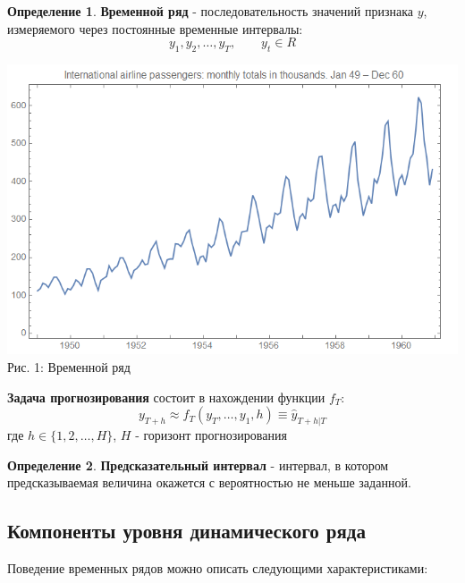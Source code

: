 \documentclass[aps,%
12pt,%
final,%
oneside,
onecolumn,%
musixtex, %
superscriptaddress,%
centertags]{article} %
\theoremstyle{plain}
\theoremstyle{definition}
\newtheorem{definition}{Определение}[subsection]
\theoremstyle{remark}
\begin{document}
\begin{definition}
	\textbf{Временной ряд}  - последовательность значений признака $y$, измеряемого через постоянные временные интервалы:
	$$y_1, y_2,\ldots, y_T, \qquad y_t \in R$$
\end{definition}

\begin{center}
	\includegraphics[scale=0.6]{images/1.png}
	Рис. 1: Временной ряд
\end{center}
\textbf{Задача прогнозирования} состоит в нахождении функции $f_T$:
$$y_{T+h} \approx f_T(y_T,\ldots,y_1,h) \equiv \hat{y}_{T+h|T}$$
где $h \in \{1,2,\ldots,H\}$, $H$ - горизонт прогнозирования

\begin{definition}
	\textbf{Предсказательный интервал} - интервал, в котором предсказываемая величина окажется с вероятностью не меньше заданной.
\end{definition}

\newpage
\subsection{Компоненты уровня динамического ряда}

Поведение временных рядов можно описать следующими характеристиками:
\end{document}
